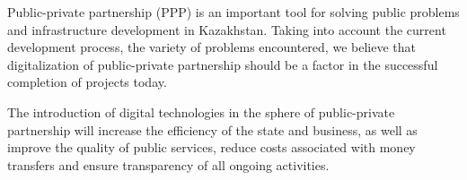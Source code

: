 
Public-private partnership (PPP) is an important tool for solving public
problems and infrastructure development in Kazakhstan. Taking into
account the current development process, the variety of problems
encountered, we believe that digitalization of public-private
partnership should be a factor in the successful completion of projects
today.

The introduction of digital technologies in the sphere of public-private
partnership will increase the efficiency of the state and business, as
well as improve the quality of public services, reduce costs associated
with money transfers and ensure transparency of all ongoing activities.

